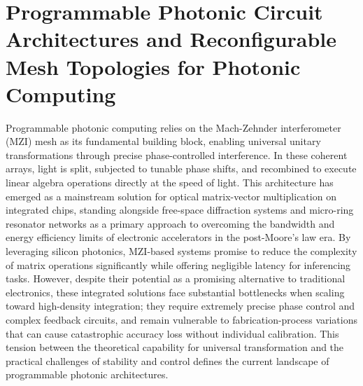 \documentclass[11pt]{article}
\begin{document}
\section{Programmable Photonic Circuit Architectures and Reconfigurable Mesh Topologies for Photonic Computing}\label{programmable-photonic-circuit-architectures-and-reconfigurable-mesh-topologies-for-photonic-computing}

Programmable photonic computing relies on the Mach-Zehnder interferometer (MZI) mesh as its fundamental building block, enabling universal unitary transformations through precise phase-controlled interference. \citep{doi_10_48550_arxiv_2407_03235_fe345c4b} \citep{doi_10_1063_5_0235712_fb28986d} In these coherent arrays, light is split, subjected to tunable phase shifts, and recombined to execute linear algebra operations directly at the speed of light. This architecture has emerged as a mainstream solution for optical matrix-vector multiplication on integrated chips, standing alongside free-space diffraction systems and micro-ring resonator networks as a primary approach to overcoming the bandwidth and energy efficiency limits of electronic accelerators in the post-Moore's law era. By leveraging silicon photonics, MZI-based systems promise to reduce the complexity of matrix operations significantly while offering negligible latency for inferencing tasks. However, despite their potential as a promising alternative to traditional electronics, these integrated solutions face substantial bottlenecks when scaling toward high-density integration; they require extremely precise phase control and complex feedback circuits, and remain vulnerable to fabrication-process variations that can cause catastrophic accuracy loss without individual calibration. This tension between the theoretical capability for universal transformation and the practical challenges of stability and control defines the current landscape of programmable photonic architectures. \citep{doi_10_1109_tnano_2022_3223915_d4da3e6b} \citep{doi_10_1088_1402_4896_ae8345_3b948559}
\end{document}
